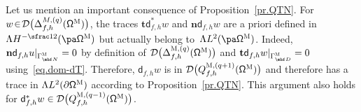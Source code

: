\noindent
Let us mention an important consequence of
Proposition~\ref{pr.QTN}. For $w\!\in\! \mathcal D\bigl(\Delta_{f,h}^{M,(q)} (\mathsf \Omega^{\textsc{M}})\bigr)$, the
traces $\mathbf{t}\mathsf d^*_{f,h}w$ and $\mathbf{n} \mathsf d_{f,h}
w$ are a priori defined in $ \Lambda H^{-\sfrac12} (\pa \mathsf \Omega^{\textsc{M}})$ but actually belong
to~$ \Lambda L^{2} (\pa \mathsf \Omega^{\textsc{M}})$. Indeed,
$\mathbf{n}\mathsf d_{f,h}u|_{\Gamma^{\textsc{M}}_{\mbf N}}=0$ by
definition of $\mathcal D\bigl(\Delta_{f,h}^{\textsc{M},(q)} (\mathsf
\Omega^{\textsc{M}})\bigr)$ and $\mathbf t \mathsf
d_{f,h}w|_{\Gamma^{\textsc{M}}_{\mbf D}}=0$ using~\eqref{eq.dom-dT}. Therefore,
$\mathsf d_{f,h}w$ is in $\mathcal D\bigl(Q^{\textsc{M},(q+1)}_{f,h} (\mathsf \Omega^{\textsc{M}}) \bigr)$ and therefore has
a trace in $ \Lambda L^{2} (\partial \mathsf \Omega^{\textsc{M}})$ according to Proposition~\ref{pr.QTN}. This argument also holds for $\mathsf d^{*}_{f,h}w\in \mathcal D\bigl(Q^{\textsc{M},(q-1)}_{f,h} (\mathsf \Omega^{\textsc{M}})\bigr)$.

